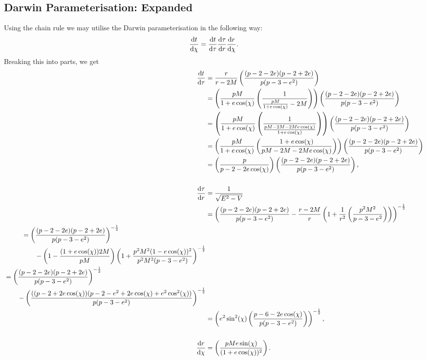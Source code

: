 \subsection{Darwin Parameterisation: Expanded}
\label{apx:darwin}
Using the chain rule we may utilise the Darwin parameterisation in the following way:
\begin{equation}
\dv{t}{\chi}=\dv{t}{\tau}\dv{\tau}{r}\dv{r}{\chi}.
\end{equation}
Breaking this into parts, we get
\begin{align}
\dv{t}{\tau}&=\frac{r}{r-2M}\left(\frac{(p-2-2e)(p-2+2e)}{p(p-3-e^2)}\right)\\
&=\left(\frac{pM}{1+e\cos(\chi)}\left(\frac{1}{\frac{pM}{1+e\cos(\chi)}-2M} \right) \right)\left(\frac{(p-2-2e)(p-2+2e)}{p(p-3-e^2)}\right)\\
&=\left(\frac{pM}{1+e\cos(\chi)}\left(\frac{1}{\frac{pM-2M-2Me\cos(\chi)}{1+e\cos(\chi)}} \right) \right)\left(\frac{(p-2-2e)(p-2+2e)}{p(p-3-e^2)}\right)\\
&=\left(\frac{pM}{1+e\cos(\chi)}\left(\frac{1+e\cos(\chi)}{pM-2M-2Me\cos(\chi)} \right) \right)\left(\frac{(p-2-2e)(p-2+2e)}{p(p-3-e^2)}\right)\\
&=\left(\frac{p}{p-2-2e\cos(\chi)} \right)\left(\frac{(p-2-2e)(p-2+2e)}{p(p-3-e^2)}\right),\\
&\\
\dv{\tau}{r}&=\frac{1}{\sqrt{E^2-V}}\\
&=\left(\frac{(p-2-2e)(p-2+2e)}{p(p-3-e^2)}-\frac{r-2M}{r}\left(1+\frac{1}{r^2}\left(\frac{p^2M^2}{p-3-e^2} \right) \right)\right)^{-\frac{1}{2}}\\
\begin{split}
&=\left(\frac{(p-2-2e)(p-2+2e)}{p(p-3-e^2)}\right)^{-\frac{1}{2}}\\
&\qquad-\left(1-\frac{(1+e\cos(\chi))2M}{pM} \right)\left(1+\frac{p^2M^2(1-e\cos(\chi))^2}{p^2M^2(p-3-e^2)}\right)^{-\frac{1}{2}}
\end{split}\\
\begin{split}
&=\left(\frac{(p-2-2e)(p-2+2e)}{p(p-3-e^2)}\right)^{-\frac{1}{2}}\\
&\qquad-\left(\frac{((p-2+2e\cos(\chi))(p-2-e^2+2e\cos(\chi)+e^2\cos^2(\chi))}{p(p-3-e^2)} \right)^{-\frac{1}{2}}
\end{split}\\
&=\left(e^2\sin^2(\chi)\left(\frac{p-6-2e\cos(\chi)}{p(p-3-e^2)} \right)\right)^{-\frac{1}{2}},\\
&\\
\dv{r}{\chi}&=\left(\frac{pMe\sin(\chi)}{(1+e\cos(\chi))^2} \right).
\end{align}
